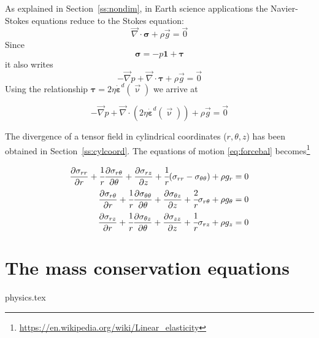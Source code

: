 As explained in Section~\ref{ss:nondim}, in Earth science applications the Navier-Stokes 
equations reduce to the Stokes equation:
\begin{equation}
{\vec \nabla}\cdot {\bm \sigma} + \rho {\vec g} = \vec{0}
\label{eq:forcebal}
\end{equation}
Since 
\begin{equation}
{\bm \sigma} = -p {\bm 1} + {\bm \tau}
\end{equation}
it also writes
\begin{equation}
-{\vec \nabla}p + {\vec \nabla}\cdot {\bm \tau} + \rho {\vec g} = \vec{0}
\end{equation}
Using the relationship ${\bm \tau} = 2 \eta \dot{\bm \varepsilon}^d(\vec\upnu)$ we arrive at 
\begin{mdframed}[backgroundcolor=blue!5]
\begin{equation}
-{\vec \nabla}p + {\vec \nabla}\cdot (2 \eta \dot{\bm \varepsilon}^d(\vec\upnu) ) + \rho {\vec g} = \vec{0}
\end{equation}
\end{mdframed}

The divergence of a tensor field in cylindrical coordinates ($r,\theta,z$)
has been obtained in Section~\ref{ss:cylcoord}.
The equations of motion \eqref{eq:forcebal} becomes\footnote{\url{https://en.wikipedia.org/wiki/Linear_elasticity}}

 \begin{align}
\frac{\partial \sigma_{rr}}{\partial r} + \cfrac{1}{r}\frac{\partial \sigma_{r\theta}}{\partial \theta} + \frac{\partial \sigma_{rz}}{\partial z} + \cfrac{1}{r}(\sigma_{rr}-\sigma_{\theta\theta}) + \rho g_r &= 0 \label{eq:momelr}\\
\frac{\partial \sigma_{r\theta}}{\partial r} + \cfrac{1}{r}\frac{\partial \sigma_{\theta\theta}}{\partial \theta} + \frac{\partial \sigma_{\theta z}}{\partial z} + \cfrac{2}{r}\sigma_{r\theta} + \rho g_\theta &=  0 \label{eq:momeltheta}\\
\frac{\partial \sigma_{rz}}{\partial r} + \cfrac{1}{r}\frac{\partial \sigma_{\theta z}}{\partial \theta} + \frac{\partial \sigma_{zz}}{\partial z} + \cfrac{1}{r}\sigma_{rz} + \rho g_z &= 0
\end{align}


\section{The mass conservation equations} 
\begin{flushright} {\tiny {\color{gray} physics.tex}} \end{flushright}

